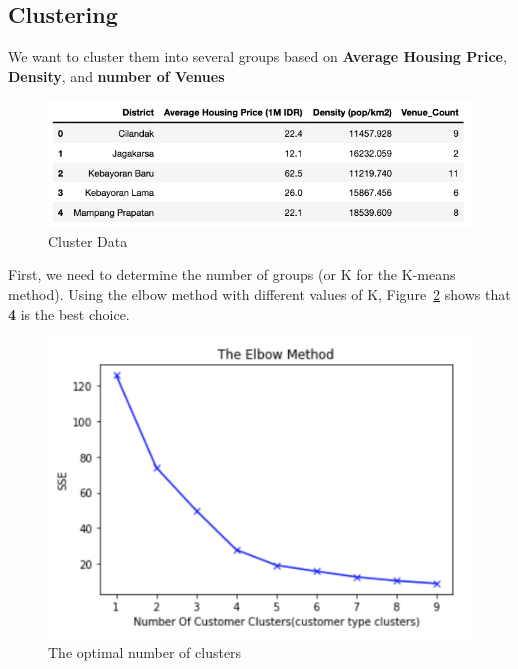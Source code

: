 \documentclass[12pt,a4paper]{article}
\begin{document}
\clearpage

\subsection{Clustering}

We want to cluster them into several groups based on \textbf{Average Housing Price}, \textbf{Density}, and \textbf{number of Venues}

\begin{center}
    \begin{figure}[htp]
    \begin{center}
     \includegraphics[width=\textwidth]{fig/cluster}
    \end{center}
    \caption{Cluster Data}
    \label{fig:cluster}
    \end{figure}
\end{center}

First, we need to determine the number of groups (or K for the K-means method). Using the elbow method with different values of K, Figure~\ref{fig:elbow} shows that \textbf{4} is the best choice.

\begin{center}
    \begin{figure}[htp]
    \begin{center}
     \includegraphics[width=\textwidth]{fig/elbow}
    \end{center}
    \caption{The optimal number of clusters}
    \label{fig:elbow}
    \end{figure}
\end{center}
\end{document}
